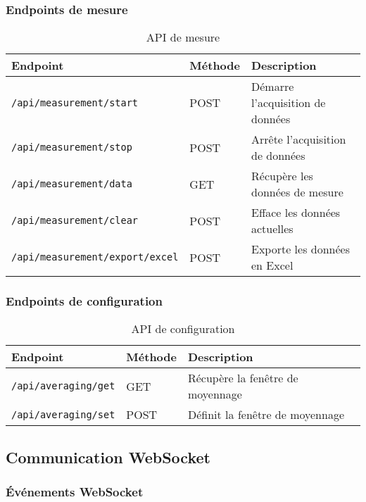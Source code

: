 \documentclass[12pt,a4paper]{article}
\begin{document}
\subsubsection{Endpoints de mesure}

\begin{table}[H]
\centering
\begin{tabular}{|l|l|p{7cm}|}
\hline
\textbf{Endpoint} & \textbf{Méthode} & \textbf{Description} \\
\hline
\texttt{/api/measurement/start} & POST & Démarre l'acquisition de données \\
\hline
\texttt{/api/measurement/stop} & POST & Arrête l'acquisition de données \\
\hline
\texttt{/api/measurement/data} & GET & Récupère les données de mesure \\
\hline
\texttt{/api/measurement/clear} & POST & Efface les données actuelles \\
\hline
\texttt{/api/measurement/export/excel} & POST & Exporte les données en Excel \\
\hline
\end{tabular}
\caption{API de mesure}
\end{table}

\subsubsection{Endpoints de configuration}

\begin{table}[H]
\centering
\begin{tabular}{|l|l|p{7cm}|}
\hline
\textbf{Endpoint} & \textbf{Méthode} & \textbf{Description} \\
\hline
\texttt{/api/averaging/get} & GET & Récupère la fenêtre de moyennage \\
\hline
\texttt{/api/averaging/set} & POST & Définit la fenêtre de moyennage \\
\hline
\end{tabular}
\caption{API de configuration}
\end{table}

\subsection{Communication WebSocket}

\subsubsection{Événements WebSocket}
\end{document}
